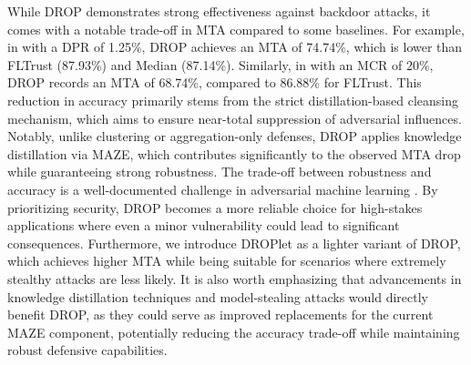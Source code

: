  While DROP demonstrates strong effectiveness against backdoor attacks, it comes with a notable trade-off in MTA compared to some baselines. For example, in  with a DPR of 1.25\%, DROP achieves an MTA of 74.74\%, which is lower than FLTrust (87.93\%) and Median (87.14\%). Similarly, in  with an MCR of 20\%, DROP records an MTA of 68.74\%, compared to 86.88\% for FLTrust. This reduction in accuracy primarily stems from the strict distillation-based cleansing mechanism, which aims to ensure near-total suppression of adversarial influences. Notably, unlike clustering or aggregation-only defenses, DROP applies knowledge distillation via MAZE, which contributes significantly to the observed MTA drop while guaranteeing strong robustness. The trade-off between robustness and accuracy is a well-documented challenge in adversarial machine learning \citep{tsipras2019robustnessoddsaccuracy}. By prioritizing security, DROP becomes a more reliable choice for high-stakes applications where even a minor vulnerability could lead to significant consequences. Furthermore, we introduce DROPlet as a lighter variant of DROP, which achieves higher MTA while being suitable for scenarios where extremely stealthy attacks are less likely. It is also worth emphasizing that advancements in knowledge distillation techniques and model-stealing attacks would directly benefit DROP, as they could serve as improved replacements for the current MAZE component, potentially reducing the accuracy trade-off while maintaining robust defensive capabilities.




